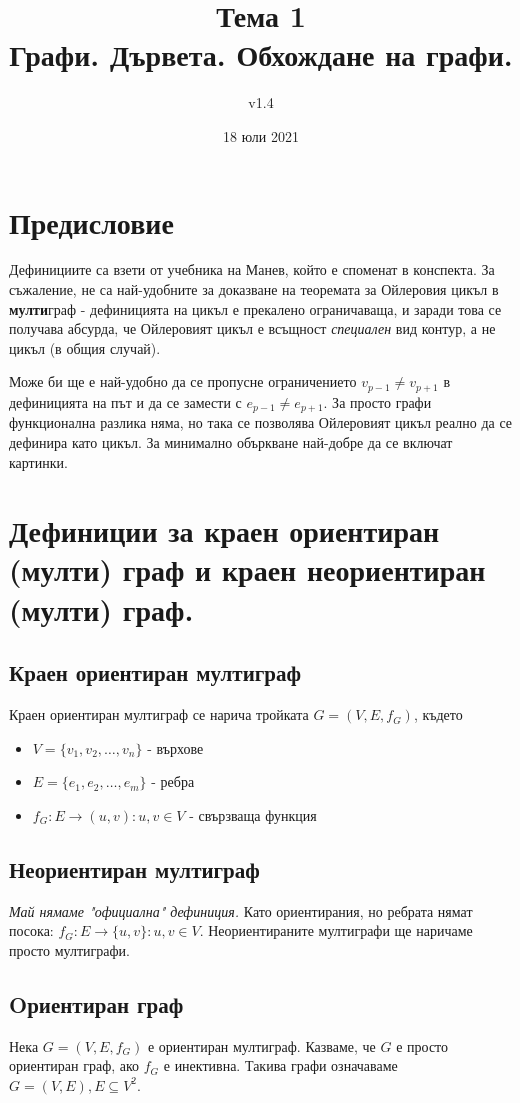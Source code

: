 \documentclass[fleqn,12pt]{article}
\title{Тема 1\\ Графи. Дървета. Обхождане на графи.}
\author{v1.4}
\date{18 юли 2021}
\begin{document}
\maketitle

\tableofcontents

\section{Предисловие}
Дефинициите са взети от учебника на Манев, който е споменат в конспекта. За съжаление, не са най-удобните за 
доказване на теоремата за Ойлеровия цикъл в \textbf{мулти}граф - дефиницията на цикъл е прекалено ограничаваща, 
и заради това се получава абсурда, че Ойлеровият цикъл е всъщност \textit{специален} вид контур, а не цикъл (в общия случай). 

Може би ще е най-удобно да се пропусне ограничението $v_{p-1} \neq v_{p+1}$ в дефиницията на път и да се замести с $e_{p-1} \neq e_{p+1}$.
За просто графи функционална разлика няма, но така се позволява Ойлеровият цикъл реално да се дефинира като цикъл. За минимално объркване най-добре да 
се включат картинки.

\section{Дефиниции за краен ориентиран (мулти) граф и краен неориентиран (мулти) граф.}
\subsection{Краен ориентиран мултиграф}
Краен ориентиран мултиграф се нарича тройката $G = (V, E, f_G)$, където
\begin{itemize}
	\item $V = \{ v_1, v_2, \dots, v_n \}$ - върхове
	\item $E = \{ e_1, e_2, \dots, e_m \}$ - ребра
	\item $f_G : E \rightarrow (u,v) : u,v \in V$ - свързваща функция
\end{itemize}

\subsection{Неориентиран мултиграф}
\textit{Май нямаме "официална" дефиниция. } Като ориентирания, но ребрата нямат посока: $f_G : E \rightarrow \{u,v\} : u,v \in V$.
Неориентираните мултиграфи ще наричаме просто мултиграфи.

\subsection{Oриентиран граф}
Нека $G = (V, E, f_G)$ е ориентиран мултиграф. Казваме, че $G$ е просто ориентиран граф, ако $f_G$ е инективна. 
Такива графи означаваме $G = (V, E), E \subseteq V^2$.
\end{document}
